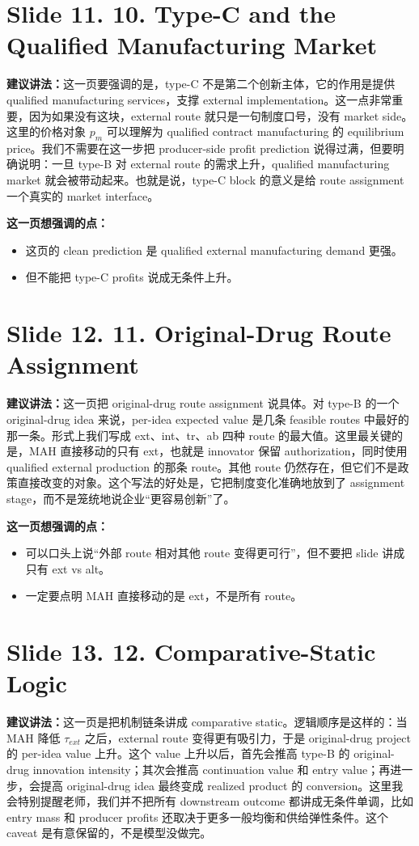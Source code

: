 \documentclass[12pt]{ctexart}
\begin{document}
\section*{Slide 11. 10. Type-C and the Qualified Manufacturing Market}
\textbf{建议讲法：}这一页要强调的是，type-C 不是第二个创新主体，它的作用是提供 qualified manufacturing services，支撑 external implementation。这一点非常重要，因为如果没有这块，external route 就只是一句制度口号，没有 market side。这里的价格对象 $p_m$ 可以理解为 qualified contract manufacturing 的 equilibrium price。我们不需要在这一步把 producer-side profit prediction 说得过满，但要明确说明：一旦 type-B 对 external route 的需求上升，qualified manufacturing market 就会被带动起来。也就是说，type-C block 的意义是给 route assignment 一个真实的 market interface。

\vspace{0.5em}
\textbf{这一页想强调的点：}
\begin{itemize}
\item 这页的 clean prediction 是 qualified external manufacturing demand 更强。
\item 但不能把 type-C profits 说成无条件上升。
\end{itemize}

\newpage
\section*{Slide 12. 11. Original-Drug Route Assignment}
\textbf{建议讲法：}这一页把 original-drug route assignment 说具体。对 type-B 的一个 original-drug idea 来说，per-idea expected value 是几条 feasible routes 中最好的那一条。形式上我们写成 ext、int、tr、ab 四种 route 的最大值。这里最关键的是，MAH 直接移动的只有 ext，也就是 innovator 保留 authorization，同时使用 qualified external production 的那条 route。其他 route 仍然存在，但它们不是政策直接改变的对象。这个写法的好处是，它把制度变化准确地放到了 assignment stage，而不是笼统地说企业“更容易创新”了。

\vspace{0.5em}
\textbf{这一页想强调的点：}
\begin{itemize}
\item 可以口头上说“外部 route 相对其他 route 变得更可行”，但不要把 slide 讲成只有 ext vs alt。
\item 一定要点明 MAH 直接移动的是 ext，不是所有 route。
\end{itemize}

\newpage
\section*{Slide 13. 12. Comparative-Static Logic}
\textbf{建议讲法：}这一页是把机制链条讲成 comparative static。逻辑顺序是这样的：当 MAH 降低 $\tau_{ext}$ 之后，external route 变得更有吸引力，于是 original-drug project 的 per-idea value 上升。这个 value 上升以后，首先会推高 type-B 的 original-drug innovation intensity；其次会推高 continuation value 和 entry value；再进一步，会提高 original-drug idea 最终变成 realized product 的 conversion。这里我会特别提醒老师，我们并不把所有 downstream outcome 都讲成无条件单调，比如 entry mass 和 producer profits 还取决于更多一般均衡和供给弹性条件。这个 caveat 是有意保留的，不是模型没做完。
\end{document}
